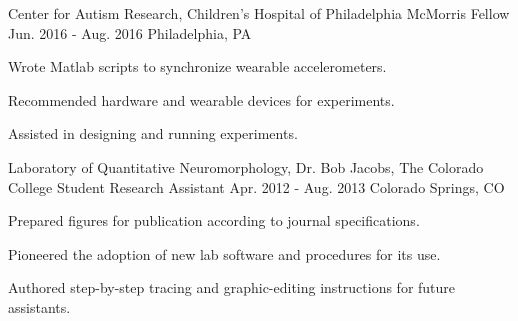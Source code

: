 \begin{cventries}
{      %
    }
  \cventry
    {Center for Autism Research, Children’s Hospital of Philadelphia} %
    {McMorris Fellow} %
    {Jun. 2016 - Aug. 2016} %
    {Philadelphia, PA} %
    {
      \begin{cvitems} %
        \item {Wrote Matlab scripts to synchronize wearable accelerometers.}
        \item {Recommended hardware and wearable devices for experiments.}
        \item {Assisted in designing and running experiments.}
      \end{cvitems}
    }
  \cventry
  	{Laboratory of Quantitative Neuromorphology, Dr. Bob Jacobs, The Colorado College} %
    {Student Research Assistant} %
    {Apr. 2012 - Aug. 2013} %
    {Colorado Springs, CO} %
    {
      \begin{cvitems} %
        \item {Prepared figures for publication according to journal specifications.}
        \item {Pioneered the adoption of new lab software and procedures for its use.}
        \item {Authored step-by-step tracing and graphic-editing instructions for future assistants.}
      \end{cvitems}
    }
\end{cventries}

